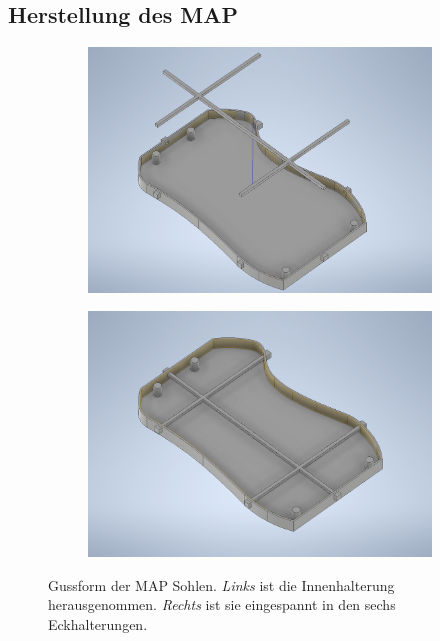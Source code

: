 \subsection{Herstellung des MAP} \label{Herstellung_MAP} \FloatBarrier
\begin{figure}[b!]
	\hfill
	\begin{subfigure}[c]{.49\linewidth}
		\centering
		\includegraphics[width=\linewidth]{Bilder/Gussform_Innenteil_verschoben.png}
	\end{subfigure}
	\begin{subfigure}[c]{.49\linewidth}
		\centering
		\includegraphics[width=\linewidth]{Bilder/Gussform.png}		
	\end{subfigure}
	\hfill
	\caption{Gussform der MAP Sohlen. \textit{Links} ist die Innenhalterung herausgenommen. \textit{Rechts} ist sie eingespannt in den sechs Eckhalterungen.}
	\label{Gussform_Inventor}
\end{figure}
